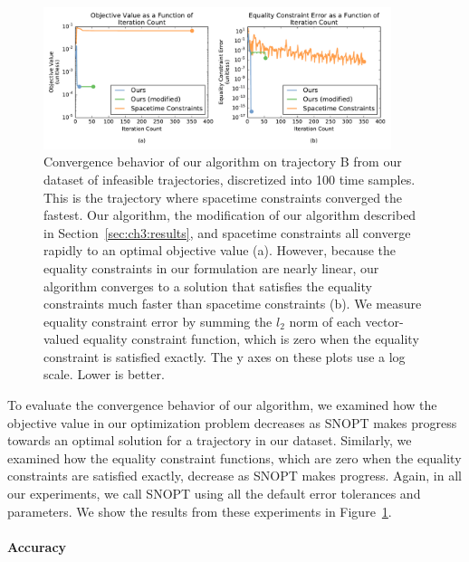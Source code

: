 \begin{figure}[t]
\centering
\includegraphics[width=4.0in]{images/2016_siggraph/01_convergence.pdf}
\caption{
Convergence behavior of our algorithm on trajectory \textsc{B} from our dataset of infeasible trajectories, discretized into 100 time samples.
This is the trajectory where spacetime constraints converged the fastest.
Our algorithm, the modification of our algorithm described in Section~\ref{sec:ch3:results}, and spacetime constraints all converge rapidly to an optimal objective value (a).
However, because the equality constraints in our formulation are nearly linear, our algorithm converges to a solution that satisfies the equality constraints much faster than spacetime constraints (b).
We measure equality constraint error by summing the $l_2$ norm of each vector-valued equality constraint function, which is zero when the equality constraint is satisfied exactly. 
The y axes on these plots use a log scale.
Lower is better.
}
\label{fig:ch3:convergence}
\end{figure}

To evaluate the convergence behavior of our algorithm, we examined how the objective value in our optimization problem decreases as SNOPT makes progress towards an optimal solution for a trajectory in our dataset.
Similarly, we examined how the equality constraint functions, which are zero when the equality constraints are satisfied exactly, decrease as SNOPT makes progress.
Again, in all our experiments, we call SNOPT using all the default error tolerances and parameters.
We show the results from these experiments in Figure~\ref{fig:ch3:convergence}.

\paragraph{Accuracy}

